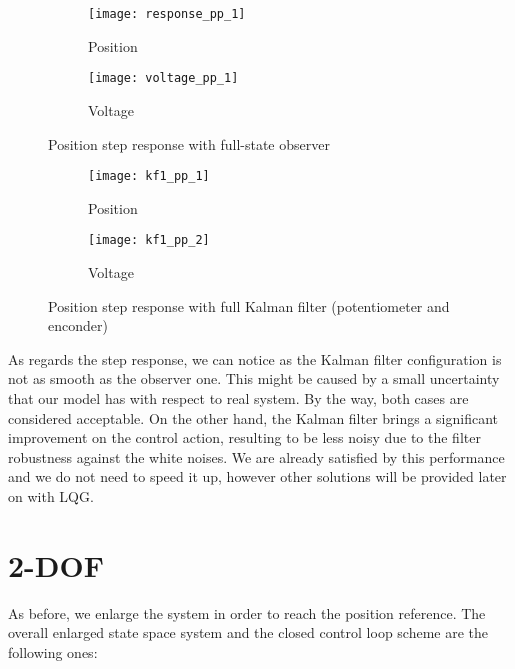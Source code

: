 \begin{figure*}[h]
	\centering
	\begin{subfigure}{0.45\columnwidth}
		\texttt{[image: response\_pp\_1]}
		\caption{Position}
	\end{subfigure}
	\begin{subfigure}{0.45\columnwidth}
		\texttt{[image: voltage\_pp\_1]}
		\caption{Voltage}
	\end{subfigure}
	\caption{Position step response with full-state observer}
	\label{fig:Position step response with full-state observer}
\end{figure*}

\begin{figure*}[h]
	\centering
	\begin{subfigure}{0.45\columnwidth}
		\texttt{[image: kf1\_pp\_1]}
		\caption{Position}
	\end{subfigure}
	\begin{subfigure}{0.45\columnwidth}
		\texttt{[image: kf1\_pp\_2]}
		\caption{Voltage}
	\end{subfigure}
	\caption{Position step response with full Kalman filter (potentiometer and enconder)}
	\label{fig:Position step response with full Kalman filter}
\end{figure*}

As regards the step response, we can notice as the Kalman filter configuration is not as smooth as the observer one. This might be caused by a small uncertainty that our model has with respect to real system. By the way, both cases are considered acceptable. On the other hand, the Kalman filter brings a significant improvement on the control action, resulting to be less noisy due to the filter robustness against the white noises.
We are already satisfied by this performance and we do not need to speed it up, however other solutions will be provided later on with LQG.

\section{2-DOF}
As before, we enlarge the system in order to reach the position reference. The overall enlarged state space system and the closed control loop scheme are the following ones:

